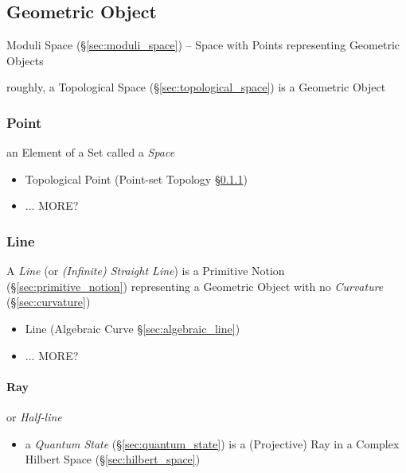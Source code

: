 \subsection{Geometric Object}\label{sec:geometric_object}

\fist Moduli Space (\S\ref{sec:moduli_space}) -- Space with Points representing
Geometric Objects

roughly, a Topological Space (\S\ref{sec:topological_space}) is a Geometric
Object



\subsubsection{Point}\label{sec:point}

an Element of a Set called a \emph{Space}

\begin{itemize}
  \item Topological Point (Point-set Topology \S\ref{sec:point})
  \item ... MORE?
\end{itemize}



\subsubsection{Line}\label{sec:line}

A \emph{Line} (or \emph{(Infinite) Straight Line}) is a Primitive Notion
(\S\ref{sec:primitive_notion}) representing a Geometric Object with no
\emph{Curvature} (\S\ref{sec:curvature})

\begin{itemize}
  \item Line (Algebraic Curve \S\ref{sec:algebraic_line})
  \item ... MORE?
\end{itemize}



\paragraph{Ray}\label{sec:ray}\hfill

or \emph{Half-line}

\begin{itemize}
  \item a \emph{Quantum State} (\S\ref{sec:quantum_state}) is a (Projective) Ray
    in a Complex Hilbert Space (\S\ref{sec:hilbert_space})
\end{itemize}



